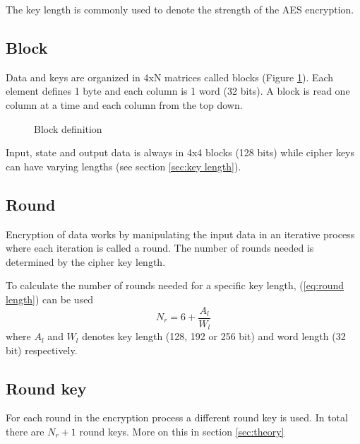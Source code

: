 \documentclass[report.tex]{subfiles}
\begin{document}
The key length is commonly used to denote the strength of the AES encryption.

\subsection{Block}
Data and keys are organized in 4xN matrices called blocks (Figure \ref{fig:block definition}). Each element defines 1 byte and each column is 1 word (32 bits). A block is read one column at a time and each column from the top down.

\begin{figure}[h]
\centering
	\caption{Block definition}
	\label{fig:block definition}
\end{figure}

Input, state and output data is always in 4x4 blocks (128 bits) while cipher keys can have varying lengths (see section \ref{sec:key length}).

\subsection{Round}
Encryption of data works by manipulating the input data in an iterative process where each iteration is called a round. The number of rounds needed is determined by the cipher key length.

To calculate the number of rounds needed for a specific key length, (\ref{eq:round length}) can be used
\begin{equation}\label{eq:round length}
	N_r = 6 + \frac{A_{l}}{W_{l}}
\end{equation}
where $A_l$ and $W_l$ denotes key length (128, 192 or 256 bit) and word length (32 bit) respectively.

\subsection{Round key}
For each round in the encryption process a different round key is used. In total there are $N_r+1$ round keys. More on this in section \ref{sec:theory}
\end{document}
